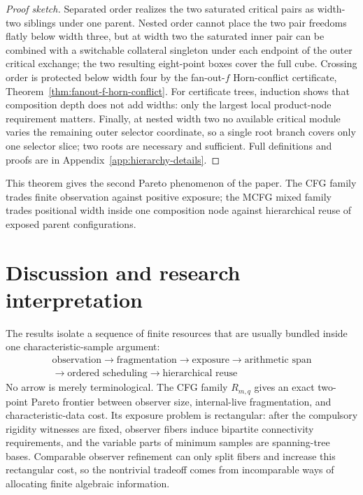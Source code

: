 \documentclass[11pt]{article}
\begin{document}
\begin{proof}[Proof sketch]
Separated order realizes the two saturated critical pairs as width-two
siblings under one parent.  Nested order cannot place the two pair freedoms
flatly below width three, but at width two the saturated inner pair can be
combined with a switchable collateral singleton under each endpoint of the
outer critical exchange; the two resulting eight-point boxes cover the full
cube.  Crossing order is protected below width four by the fan-out-$f$
Horn-conflict certificate, Theorem~\ref{thm:fanout-f-horn-conflict}.  For certificate trees,
induction shows that composition depth does not add widths: only the largest
local product-node requirement matters.  Finally, at nested width two no
available critical module varies the remaining outer selector coordinate, so
a single root branch covers only one selector slice; two roots are necessary
and sufficient.  Full definitions and proofs are in
Appendix~\ref{app:hierarchy-details}.
\end{proof}

This theorem gives the second Pareto phenomenon of the paper.  The CFG family
trades finite observation against positive exposure; the MCFG mixed family
trades positional width inside one composition node against hierarchical reuse
of exposed parent configurations.

\section{Discussion and research interpretation}

The results isolate a sequence of finite resources that are usually bundled
inside one characteristic-sample argument:
\[
 \boxed{\begin{gathered}
 \text{observation}\to\text{fragmentation}\to\text{exposure}
 \to\text{arithmetic span}\\
 \to\text{ordered scheduling}\to\text{hierarchical reuse}
 \end{gathered}}
\]
No arrow is merely terminological.  The CFG family $R_{m,q}$ gives an exact
two-point Pareto frontier between observer size, internal-live fragmentation,
and characteristic-data cost.  Its exposure problem is rectangular: after the compulsory rigidity witnesses
are fixed, observer fibers induce bipartite connectivity requirements, and the
variable parts of minimum samples are spanning-tree bases.  Comparable observer refinement can only split fibers and
increase this rectangular cost, so the nontrivial tradeoff comes from
incomparable ways of allocating finite algebraic information.
\end{document}
